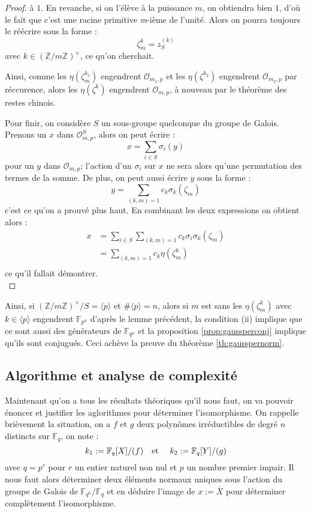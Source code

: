 \documentclass[a4paper]{article} %
\numberwithin{section}{part}
\numberwithin{equation}{section}
\newcommand\nroot[1]{\textit{#1}-ième}
\newcommand\zmodninv[1]{(\mathbb{Z}/#1\mathbb{Z})^{\times}}
\newcommand\GF[1]{\mathbb{F}_{#1}}
\newcommand\EO{\mathcal{O}}
\newcommand\etmath{\textup{\quad et \quad}}
\newcommand\groupgen[1]{\langle{#1}\rangle}
\begin{document}
\begin{proof}
à $1$. En revanche, si on l'élève à la puissance $m$, on obtiendra bien $1$, 
d'où le fait que c'est une racine primitive \nroot{m} de l'unité. Alors on 
pourra toujours le réécrire sous la forme : 
\[\zeta_m^k = z_S^{(k)}\]
avec $k\in\zmodninv{m}$, ce qu'on cherchait.\par
\fi
Ainsi, comme les $\eta(\zeta_m^{k_1})$ engendrent $\EO_{m_1,p}$ et les 
$\eta(\zeta^{k_2})$ engendrent $\EO_{m_2,p}$ par réccurence, alors les 
$\eta(\zeta^k)$ engendrent $\EO_{m,p}$, à nouveau par le théorème des restes 
chinois.\par
Pour finir, on considère $S$ un sous-groupe quelconque du groupe de Galois. 
Prenons un $x$ dans $\EO_{m,p}^S$, alors on peut écrire :
\begin{equation}
x = \sum_{i\in S}{\sigma_i(y)}
\end{equation}
pour un $y$ dans $\EO_{m,p}$; l'action d'un $\sigma_i$ sur $x$ ne sera alors
qu'une permutation des termes de la somme. De plus, on peut aussi écrire $y$ 
sous la forme :
\begin{equation}
y = \sum_{(k,m)=1}{c_k\sigma_k(\zeta_m)}
\end{equation}
c'est ce qu'on a prouvé plus haut. En combinant les deux expressions on obtient 
alors :
\begin{align*}
x &= \sum_{i\in S}{\sum_{(k,m)=1}{c_k\sigma_i\sigma_k(\zeta_m)}}\\
&= \sum_{(k,m)=1}{c_k\eta(\zeta_m^k)}\\
\end{align*}
ce qu'il fallait démontrer.\\
\end{proof}

Ainsi, si $\zmodninv{m}/S = \groupgen{p}$ et $\#\groupgen{p} = n$, alors si $m$ 
est sans les $\eta(\zeta_m^k)$ avec $k\in\groupgen{p}$  engendrent $\GF{p^n}$
d'après le lemme précédent, la condition (ii) implique que ce sont aussi
des générateurs de $\GF{q^n}$ et la proposition \ref{prop:gaussperconj} implique
qu'ils sont conjugués. Ceci achève la preuve du théorème \ref{th:gausspernorm}.

\subsection{Algorithme et analyse de complexité}
\label{sec:algcompcycl}
Maintenant qu'on a tous les résultats théoriques qu'il nous faut, on va pouvoir
énoncer et justifier les aglorithmes pour déterminer l'isomorphisme. 
On rappelle brièvement la situation, on a $f$ et $g$ deux polynômes 
irréductibles de degré $n$ distincts sur $\GF{q}$, on note :
\[k_1 := \GF{q}[X]/(f)\etmath k_2 := \GF{q}[Y]/(g)\]
avec $q = p^r$ pour $r$ un entier naturel non nul et $p$ un nombre premier
impair. Il nous faut alors déterminer deux éléments normaux uniques sous
l'action du groupe de Galois de $\GF{q^n}/\GF{q}$ et en déduire l'image de $x :=
\overline{X}$ pour déterminer complètement l'isomorphisme. 
\end{document}
